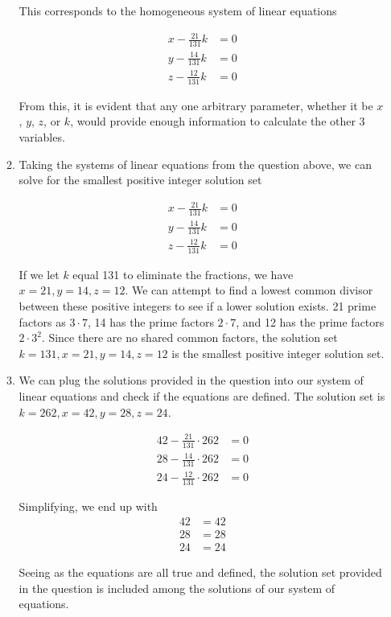 \documentclass[11pt, letterpaper, twoside]{article}
\begin{document}
\begin{enumerate}
\begin{enumerate}[label=(\alph*)]
This corresponds to the homogeneous system of linear equations

\begin{align*}
x - \frac{21}{131}k &=  0 \\
y - \frac{14}{131}k &=  0\\
z-\frac{12}{131}k &= 0
\end{align*}

From this, it is evident that any one arbitrary parameter, whether it be $x$, $y$, $z$, or $k$, would provide enough information to calculate the other 3 variables.

\item Taking the systems of linear equations from the question above, we can solve for the smallest positive integer solution set

\begin{align*}
x - \frac{21}{131}k &=  0 \\
y - \frac{14}{131}k &=  0\\
z-\frac{12}{131}k &= 0
\end{align*}

If we let $k$ equal 131 to eliminate the fractions, we have $x=21, y=14, z=12$. We can attempt to find a lowest common divisor between these positive integers to see if a lower solution exists. 21 prime factors as $3\cdot7$, 14 has the prime factors $2\cdot 7$, and 12 has the prime factors $2\cdot 3^2$. Since there are no shared common factors, the solution set $\boxed{k=131, x=21, y=14, z=12}$ is the smallest positive integer solution set.

\item We can plug the solutions provided in the question into our system of linear equations and check if the equations are defined. The solution set is $k=262, x=42, y=28, z=24$.

\begin{align*}
42 - \frac{21}{131}\cdot262 &=  0 \\
28 - \frac{14}{131}\cdot262 &=  0\\
24-\frac{12}{131}\cdot262 &= 0
\end{align*}

Simplifying, we end up with
\begin{align*}
42 &= 42 \\
28&=  28\\
24 &= 24
\end{align*}

Seeing as the equations are all true and defined, the solution set provided in the question is included among the solutions of our system of equations.

\end{enumerate}
\end{enumerate}
\end{document}
